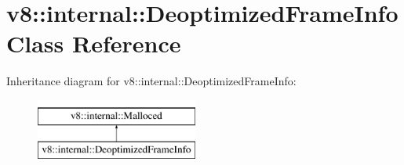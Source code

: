 \hypertarget{classv8_1_1internal_1_1DeoptimizedFrameInfo}{}\section{v8\+:\+:internal\+:\+:Deoptimized\+Frame\+Info Class Reference}
\label{classv8_1_1internal_1_1DeoptimizedFrameInfo}
Inheritance diagram for v8\+:\+:internal\+:\+:Deoptimized\+Frame\+Info\+:\begin{figure}[H]
\begin{center}
\leavevmode
\includegraphics[height=2.000000cm]{classv8_1_1internal_1_1DeoptimizedFrameInfo}
\end{center}
\end{figure}
